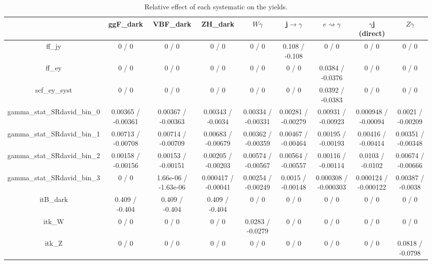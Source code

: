 \documentclass[10pt]{article}
\begin{document}
\begin{table}[htbp]
\begin{center}
\begin{tabular}{|c|c|c|c|c|c|c|c|c|}
\hline 
      & ggF_{dark}      & VBF_{dark}      & ZH_{dark}      & $W\gamma$      & j$\rightarrow\gamma$      & $e\rightsquigarrow\gamma$      & $\gamma$j (direct)      & $Z\gamma$ \\ 
\hline 
  ff_jy & 0 / 0 & 0 / 0 & 0 / 0 & 0 / 0 & 0.108 / -0.108 & 0 / 0 & 0 / 0 & 0 / 0 \\ 
  ff_ey & 0 / 0 & 0 / 0 & 0 / 0 & 0 / 0 & 0 / 0 & 0.0384 / -0.0376 & 0 / 0 & 0 / 0 \\ 
  scf_ey_syst & 0 / 0 & 0 / 0 & 0 / 0 & 0 / 0 & 0 / 0 & 0.0392 / -0.0383 & 0 / 0 & 0 / 0 \\ 
  gamma_stat_SRdavid_bin_0 & 0.00365 / -0.00361 & 0.00367 / -0.00363 & 0.00343 / -0.0034 & 0.00334 / -0.00331 & 0.00281 / -0.00279 & 0.00931 / -0.00923 & 0.000948 / -0.00094 & 0.0021 / -0.00209 \\ 
  gamma_stat_SRdavid_bin_1 & 0.00713 / -0.00708 & 0.00714 / -0.00709 & 0.00683 / -0.00679 & 0.00362 / -0.00359 & 0.00467 / -0.00464 & 0.00195 / -0.00193 & 0.00416 / -0.00414 & 0.00351 / -0.00348 \\ 
  gamma_stat_SRdavid_bin_2 & 0.00158 / -0.00156 & 0.00153 / -0.00151 & 0.00205 / -0.00203 & 0.00574 / -0.00567 & 0.00564 / -0.00557 & 0.00116 / -0.00114 & 0.0103 / -0.0102 & 0.00674 / -0.00666 \\ 
  gamma_stat_SRdavid_bin_3 & 0 / 0 & 1.66e-06 / -1.63e-06 & 0.000417 / -0.00041 & 0.00254 / -0.00249 & 0.0015 / -0.00148 & 0.000308 / -0.000303 & 0.000124 / -0.000122 & 0.00387 / -0.0038 \\ 
  it{B}_{dark} & 0.409 / -0.404 & 0.409 / -0.404 & 0.409 / -0.404 & 0 / 0 & 0 / 0 & 0 / 0 & 0 / 0 & 0 / 0 \\ 
   it{k_{W}} & 0 / 0 & 0 / 0 & 0 / 0 & 0.0283 / -0.0279 & 0 / 0 & 0 / 0 & 0 / 0 & 0 / 0 \\ 
   it{k_{Z}} & 0 / 0 & 0 / 0 & 0 / 0 & 0 / 0 & 0 / 0 & 0 / 0 & 0 / 0 & 0.0818 / -0.0798 \\ 
\hline 
\end{tabular} 
\caption{Relative effect of each systematic on the yields.} 
\end{center} 
\end{table} 
\end{document}
